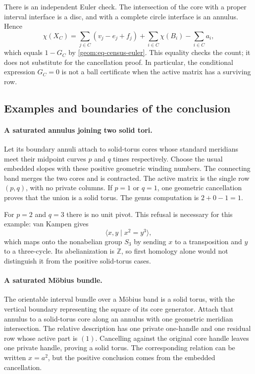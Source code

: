 There is an independent Euler check.  The intersection of the core
with a proper interval interface is a disc, and with a complete
circle interface is an annulus.  Hence
\[
 \chi(X_C)=\sum_{j\in C}(v_j-e_j+f_j)
           +\sum_{i\in C}\chi(B_i)-\sum_{i\in C}a_i,
\]
which equals $1-G_C$ by \eqref{geom:eq-census-euler}.  This equality
checks the count; it does not substitute for the cancellation proof.
In particular, the conditional expression $G_C=0$ is not a ball
certificate when the active matrix has a surviving row.

\subsection{Examples and boundaries of the conclusion}
\label{geom:examples}

\paragraph{A saturated annulus joining two solid tori.}
Let its boundary annuli attach to solid-torus cores whose standard
meridians meet their midpoint curves $p$ and $q$ times respectively.
Choose the usual embedded slopes with these positive geometric
winding numbers.  The connecting band merges the two cores and
is contracted.  The active matrix is the single row $(p,q)$, with
no private columns.  If $p=1$ or $q=1$, one geometric cancellation
proves that the union is a solid torus.  The genus computation is
$2+0-1=1$.

For $p=2$ and $q=3$ there is no unit pivot.  This refusal is
necessary for this example: van Kampen gives
\[
 \langle x,y\mid x^2=y^3\rangle,
\]
which maps onto the nonabelian group $S_3$ by sending $x$ to a
transposition and $y$ to a three-cycle.  Its abelianization is
$\mathbb Z$, so first homology alone would not distinguish it
from the positive solid-torus cases.

\paragraph{A saturated M\"obius bundle.}
The orientable interval bundle over a M\"obius band is a solid
torus, with the vertical boundary representing the square of its
core generator.  Attach that annulus to a solid-torus core along
an annulus with one geometric meridian intersection.  The relative
description has one private one-handle and one residual row whose
active part is $(1)$.  Cancelling against the original core handle
leaves one private handle, proving a solid torus.  The corresponding
relation can be written $x=a^2$, but the positive conclusion comes
from the embedded cancellation.

